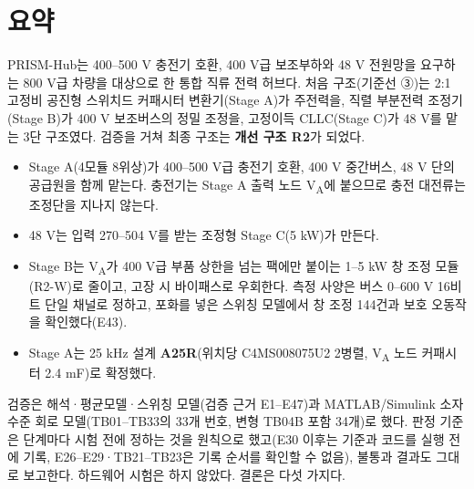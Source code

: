 \chapter*{요약}

PRISM-Hub는 400–500 V 충전기 호환, 400 V급 보조부하와 48 V 전원망을 요구하는 800 V급 차량을 대상으로 한 통합 직류 전력 허브다. 처음 구조(기준선 ③)는 2:1 고정비 공진형 스위치드 커패시터 변환기(Stage A)가 주전력을, 직렬 부분전력 조정기(Stage B)가 400 V 보조버스의 정밀 조정을, 고정이득 CLLC(Stage C)가 48 V를 맡는 3단 구조였다. 검증을 거쳐 최종 구조는 \textbf{개선 구조 R2}가 되었다.

\begin{itemize}
\item Stage A(4모듈 8위상)가 400--500 V급 충전기 호환, 400 V 중간버스, 48 V 단의 공급원을 함께 맡는다. 충전기는 Stage A 출력 노드 V\textsubscript{A}에 붙으므로 충전 대전류는 조정단을 지나지 않는다.
\item 48 V는 입력 270--504 V를 받는 조정형 Stage C(5 kW)가 만든다.
\item Stage B는 V\textsubscript{A}가 400 V급 부품 상한을 넘는 팩에만 붙이는 1--5 kW 창 조정 모듈(R2-W)로 줄이고, 고장 시 바이패스로 우회한다. 측정 사양은 버스 0--600 V 16비트 단일 채널로 정하고, 포화를 넣은 스위칭 모델에서 창 조정 144건과 보호 오동작을 확인했다(E43).
\item Stage A는 25 kHz 설계 \textbf{A25R}(위치당 C4MS008075U2 2병렬, V\textsubscript{A} 노드 커패시터 2.4 mF)로 확정했다.
\end{itemize}

검증은 해석·평균모델·스위칭 모델(검증 근거 E1--E47)과 MATLAB/Simulink 소자 수준 회로 모델(TB01--TB33의 33개 번호, 변형 TB04B 포함 34개)로 했다. 판정 기준은 단계마다 시험 전에 정하는 것을 원칙으로 했고(E30 이후는 기준과 코드를 실행 전에 기록, E26–E29·TB21–TB23은 기록 순서를 확인할 수 없음), 불통과 결과도 그대로 보고한다. 하드웨어 시험은 하지 않았다. 결론은 다섯 가지다.

